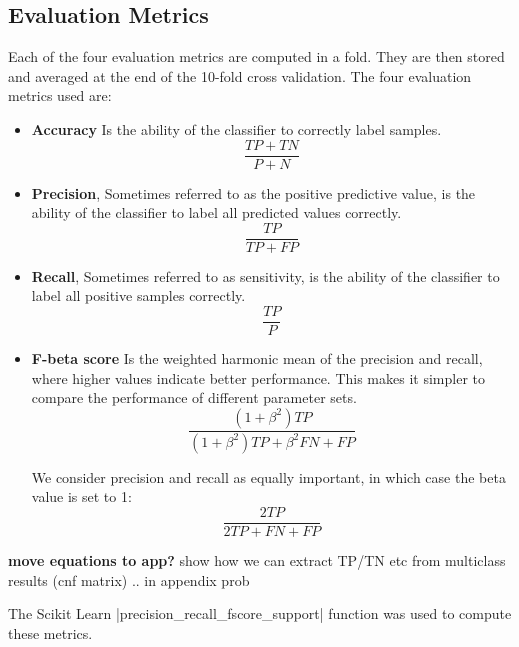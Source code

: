 \subsection{Evaluation Metrics}\label{sec:metrics}
Each of the four evaluation metrics are computed in a fold.
They are then stored and averaged at the end of the 10-fold cross validation.
The four evaluation metrics used are:
\begin{itemize}
  \item \textbf{Accuracy}
    Is the ability of the classifier to correctly label samples.
    \begin{equation}
      \frac{TP+TN}{P+N}
    \end{equation}

  \item \textbf{Precision},
    Sometimes referred to as the positive predictive value, is the ability of the
    classifier to label all predicted values correctly.
    \begin{equation}
      \frac{TP}{TP+FP}
    \end{equation}

  \item \textbf{Recall},
    Sometimes referred to as sensitivity, is the ability of the classifier to
    label all positive samples correctly.
    \begin{equation}
      \frac{TP}{P}
    \end{equation}

  \item \textbf{F-beta score}
    Is the weighted harmonic mean of the precision and recall, where
    higher values indicate better performance.
    This makes it simpler to compare the performance of different parameter sets.
    \begin{equation}
      \frac{(1+\beta^2)TP}{(1+\beta^2)TP+\beta^2FN+FP}
    \end{equation}

    We consider precision and recall as equally important, in which case the
    beta value is set to 1:
    \begin{equation}
      \frac{2TP}{2TP+FN+FP}
    \end{equation}
\end{itemize}
\textbf{move equations to app?}
show how we can extract TP/TN etc from multiclass results (cnf matrix) .. in
appendix prob

The Scikit Learn |precision_recall_fscore_support| function was used to compute
these metrics.

